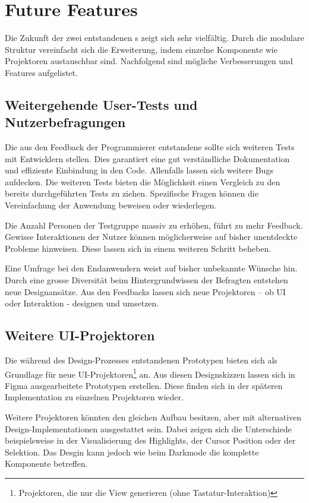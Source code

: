 \section{Future Features}
\label{sec:future}

Die Zukunft der zwei entstandenen s zeigt sich sehr vielfältig.
Durch die modulare Struktur vereinfacht sich die Erweiterung, indem einzelne Komponente wie Projektoren austauschbar sind.
Nachfolgend sind mögliche Verbesserungen und Features aufgelistet.


\subsection{Weitergehende User-Tests und Nutzerbefragungen}
\label{sec:moreUserTests}

Die aus den Feedback der Programmierer entstandene  sollte sich weiteren Tests mit Entwicklern stellen. 
Dies garantiert eine gut verständliche Dokumentation und effiziente Einbindung in den Code.
Allenfalls lassen sich weitere Bugs aufdecken.
Die weiteren Tests bieten die Möglichkeit einen Vergleich zu den bereits durchgeführten Tests zu ziehen.
Spezifische Fragen können die Vereinfachung der Anwendung beweisen oder wiederlegen.

Die Anzahl Personen der Testgruppe massiv zu erhöhen, führt zu mehr Feedback.
Gewisse Interaktionen der Nutzer können möglicherweise auf bisher unentdeckte Probleme hinweisen.
Diese lassen sich in einem weiteren Schritt beheben.

Eine Umfrage bei den Endanwendern weist auf bisher unbekannte Wünsche hin. 
Durch eine grosse Diversität beim Hintergrundwissen der Befragten entstehen neue Designansätze.
Aus den Feedbacks lassen sich neue Projektoren – ob UI oder Interaktion - designen und umsetzen.


\subsection{Weitere UI-Projektoren}
\label{sec:moreUi}

Die während des Design-Prozesses entstandenen Prototypen bieten sich als Grundlage für neue UI-Projektoren\footnote{
    Projektoren, die nur die View generieren (ohne Tastatur-Interaktion)
} an.
Aus diesen Designskizzen lassen sich in Figma ausgearbeitete Prototypen erstellen.
Diese finden sich in der späteren Implementation zu einzelnen Projektoren wieder.

Weitere Projektoren könnten den gleichen Aufbau besitzen, aber mit alternativen Design-Implementationen ausgestattet sein.
Dabei zeigen sich die Unterschiede beispielsweise in der Visualisierung des Highlights, der Cursor Position oder der Selektion.
Das Desgin kann jedoch wie beim Darkmode die komplette Komponente betreffen.

